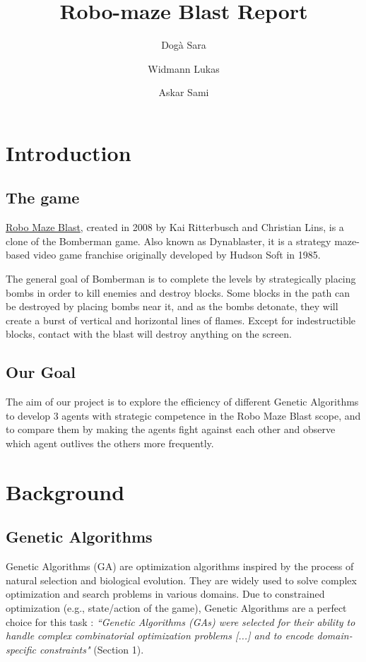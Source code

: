 \documentclass[sigconf]{acmart} %
\title{Robo-maze Blast Report}
\author{Dogà Sara}
\author{Widmann Lukas}
\author{Askar Sami}
\begin{document}
\maketitle



\section{Introduction}

\subsection{The game}
\href{https://codeberg.org/chrlns/robo-maze-blast.git}{Robo Maze Blast}, created in 2008 by Kai Ritterbusch and Christian Lins, is a clone of the Bomberman game. Also known as Dynablaster, it is a strategy maze-based video game franchise originally developed by Hudson Soft in 1985.

The general goal of Bomberman is to complete the levels by strategically placing bombs in order to kill enemies and destroy blocks. Some blocks in the path can be destroyed by placing bombs near it, and as the bombs detonate, they will create a burst of vertical and horizontal lines of flames. Except for indestructible blocks, contact with the blast will destroy anything on the screen.

\subsection{Our Goal}
The aim of our project is to explore the efficiency of different Genetic Algorithms to develop 3 agents with strategic competence in the Robo Maze Blast scope, and to compare them by making the agents fight against each other and observe which agent outlives the others more frequently.

\section{Background}
\subsection{Genetic Algorithms}
Genetic Algorithms (GA) are optimization algorithms inspired by the process of natural selection and biological evolution. They are widely used to solve complex optimization and search problems in various domains. 
Due to constrained optimization (e.g., state/action of the game), Genetic Algorithms are a perfect choice for this task \cite{popescu2025}: 
\textit{``Genetic Algorithms (GAs) were selected for their ability to handle complex combinatorial optimization problems [...] and to encode domain-specific constraints"} (Section 1).
\end{document}

